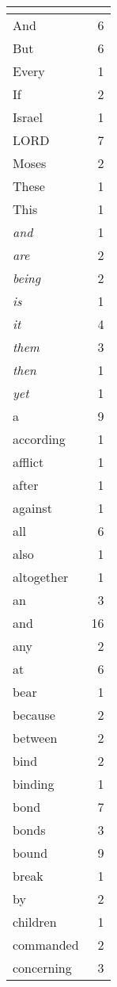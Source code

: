 \begin{center}
\begin{longtable}{l|r}
\hline \multicolumn{2}{c}{{ }} \\ \hline
\endfoot 
And & 6\\ \hline 
But & 6\\ \hline 
Every & 1\\ \hline 
If & 2\\ \hline 
Israel & 1\\ \hline 
LORD & 7\\ \hline 
Moses & 2\\ \hline 
These & 1\\ \hline 
This & 1\\ \hline 
\emph{and} & 1\\ \hline 
\emph{are} & 2\\ \hline 
\emph{being} & 2\\ \hline 
\emph{is} & 1\\ \hline 
\emph{it} & 4\\ \hline 
\emph{them} & 3\\ \hline 
\emph{then} & 1\\ \hline 
\emph{yet} & 1\\ \hline 
a & 9\\ \hline 
according & 1\\ \hline 
afflict & 1\\ \hline 
after & 1\\ \hline 
against & 1\\ \hline 
all & 6\\ \hline 
also & 1\\ \hline 
altogether & 1\\ \hline 
an & 3\\ \hline 
and & 16\\ \hline 
any & 2\\ \hline 
at & 6\\ \hline 
bear & 1\\ \hline 
because & 2\\ \hline 
between & 2\\ \hline 
bind & 2\\ \hline 
binding & 1\\ \hline 
bond & 7\\ \hline 
bonds & 3\\ \hline 
bound & 9\\ \hline 
break & 1\\ \hline 
by & 2\\ \hline 
children & 1\\ \hline 
commanded & 2\\ \hline 
concerning & 3\\ \hline 

\end{longtable}
\end{center}
